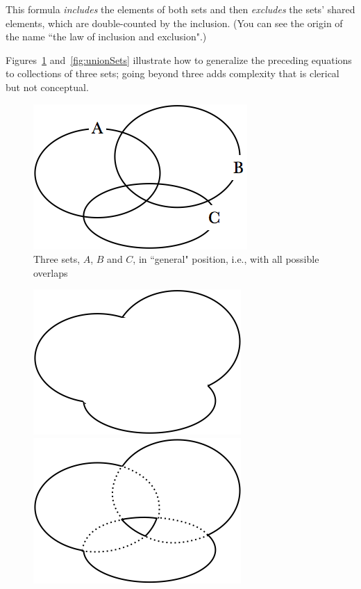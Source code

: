 \begin{itemize}
\begin{itemize}
This formula {\em includes} the elements of both sets and then {\em excludes} the sets' shared elements, which are double-counted by the inclusion.  (You can see the origin of the name ``the law of inclusion and exclusion".)
 \end{itemize}
Figures~\ref{fig:unionSetsInit} and~\ref{fig:unionSets} illustrate how to generalize the preceding equations to collections of three sets; going beyond three adds complexity that is clerical but not conceptual.
\begin{figure}[htb]
\begin{center}
        \includegraphics[scale=0.35]{FiguresMaths/3sets}
    \caption{Three sets, $A$, $B$ and $C$, in ``general" position, i.e., with all possible overlaps}
        \label{fig:unionSetsInit}
\end{center}
\end{figure}
\begin{figure}[htb]
\begin{center}
        \includegraphics[scale=0.35]{FiguresMaths/RuleAdditive}
        \hspace{1cm}
        \includegraphics[scale=0.35]{FiguresMaths/RuleAdditive2}

\end{center}
\end{figure}
\end{itemize}
